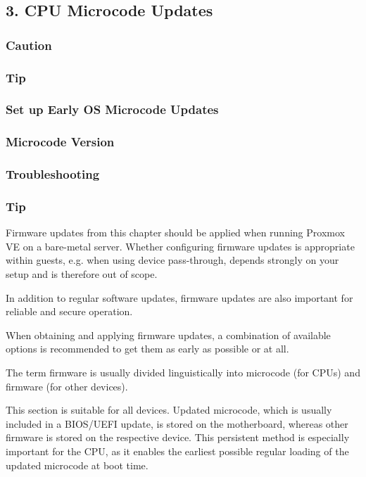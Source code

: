 \subsection{3. CPU Microcode Updates}

\subsubsection{Caution}

\subsubsection{Tip}

\subsubsection{Set up Early OS Microcode Updates}

\subsubsection{Microcode Version}

\subsubsection{Troubleshooting}

\subsubsection{Tip}

Firmware updates from this chapter should be applied when running Proxmox VE on a bare-metal server. Whether configuring firmware updates is appropriate within guests, e.g. when using device pass-through, depends strongly on your setup and is therefore out of scope.

In addition to regular software updates, firmware updates are also important for reliable and secure operation.

When obtaining and applying firmware updates, a combination of available options is recommended to get them as early as possible or at all.

The term firmware is usually divided linguistically into microcode (for CPUs) and firmware (for other devices).

This section is suitable for all devices. Updated microcode, which is usually included in a BIOS/UEFI update, is stored on the motherboard, whereas other firmware is stored on the respective device. This persistent method is especially important for the CPU, as it enables the earliest possible regular loading of the updated microcode at boot time.

